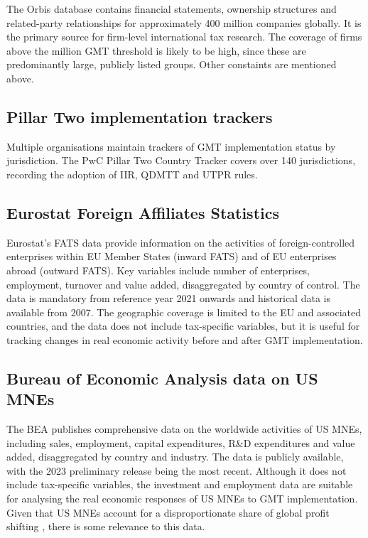 \documentclass[11pt,a4paper]{article}
\newcommand{\EUR}{\texteuro}
\begin{document}
The Orbis database contains financial statements, ownership structures and related-party relationships for approximately 400 million companies globally. It is the primary source for firm-level international tax research. The coverage of firms above the \EUR 750 million GMT threshold is likely to be high, since these are predominantly large, publicly listed groups. Other constaints are mentioned above. 

\subsection{Pillar Two implementation trackers}

Multiple organisations maintain trackers of GMT implementation status by jurisdiction. The PwC Pillar Two Country Tracker covers over 140 jurisdictions, recording the adoption of IIR, QDMTT and UTPR rules. 

\subsection{Eurostat Foreign Affiliates Statistics}

Eurostat's FATS data provide information on the activities of foreign-controlled enterprises within EU Member States (inward FATS) and of EU enterprises abroad (outward FATS). Key variables include number of enterprises, employment, turnover and value added, disaggregated by country of control. The data is mandatory from reference year 2021 onwards and historical data is available from 2007. The geographic coverage is limited to the EU and associated countries, and the data does not include tax-specific variables, but it is useful for tracking changes in real economic activity before and after GMT implementation.

\subsection{Bureau of Economic Analysis data on US MNEs}

The BEA publishes comprehensive data on the worldwide activities of US MNEs, including sales, employment, capital expenditures, R\&D expenditures and value added, disaggregated by country and industry. The data is publicly available, with the 2023 preliminary release being the most recent. Although it does not include tax-specific variables, the investment and employment data are suitable for analysing the real economic responses of US MNEs to GMT implementation. Given that US MNEs account for a disproportionate share of global profit shifting \citep{torslov2022}, there is some relevance to this data. 
\end{document}
